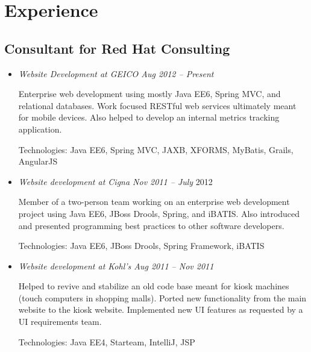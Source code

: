 \documentclass[a4paper,11pt]{article}
\begin{document}

\section*{Experience}

\subsection*{Consultant for Red Hat Consulting}

  \vskip 5pt
  \begin{itemize}

    \item \textit{Website Development at GEICO \hfill Aug 2012 -- Present}

      Enterprise web development using mostly Java EE6, Spring MVC, and
      relational databases. Work focused RESTful web services ultimately meant
      for mobile devices. Also helped to develop an internal metrics tracking
      application.

      Technologies: Java EE6, Spring MVC, JAXB, XFORMS, MyBatis, Grails,
      AngularJS


    \item \textit{Website development at Cigna \hfill Nov 2011 -- July}
      2012

      Member of a two-person team working on an enterprise web development
      project using Java EE6, JBoss Drools, Spring, and iBATIS. Also introduced
      and presented programming best practices to other software developers.

      Technologies: Java EE6, JBoss Drools, Spring Framework, iBATIS

    \item \textit{Website development at Kohl's \hfill Aug 2011 -- Nov 2011}

      Helped to revive and stabilize an old code base meant for kiosk machines
      (touch computers in shopping malls). Ported new functionality from the
      main website to the kiosk website. Implemented new UI features as
      requested by a UI requirements team.

      Technologies: Java EE4, Starteam, IntelliJ, JSP

  \end{itemize}
\end{document}
